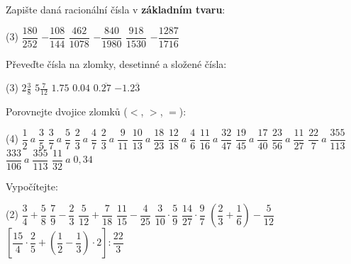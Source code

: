 \documentclass[12pt,a4paper]{article}
\begin{document}
\newpage
\setcounter{section}{3}
\begin{exercise}
Zapište daná racionální čísla v \textbf{základním tvaru}:
\begin{tasks}(3)
    \task $\dfrac{180}{252}$
    \task $-\dfrac{108}{144}$
    \task $\dfrac{462}{1078}$
    \task $-\dfrac{840}{1980}$
    \task $\dfrac{918}{1530}$
    \task $-\dfrac{1287}{1716}$
\end{tasks}
\end{exercise}

\begin{exercise}
Převeďte čísla na zlomky, desetinné a složené čísla:
\begin{tasks}(3)
    \task $2\tfrac{3}{8}$
    \task $5\tfrac{7}{12}$
    \task $1.75$
    \task $0.04$
    \task $0.\overline{27}$
    \task $-1.2\overline{3}$
\end{tasks}
\end{exercise}

\begin{exercise}
Porovnejte dvojice zlomků ($<$, $>$, $=$):
\begin{tasks}(4)
    \task $\dfrac{1}{2}\ a \;\dfrac{3}{5}$
    \task $\dfrac{3}{7}\ a \;\dfrac{5}{7}$
    \task $\dfrac{2}{3}\ a \;\dfrac{4}{7}$
    \task $\dfrac{2}{3}\ a \;\dfrac{9}{11}$
    \task $\dfrac{10}{13}\ a \;\dfrac{18}{23}$
    \task $\dfrac{12}{18}\ a \;\dfrac{4}{6}$
    \task $\dfrac{11}{16}\ a \;\dfrac{32}{47}$
    \task $\dfrac{19}{45}\ a \;\dfrac{17}{40}$
    \task $\dfrac{23}{56}\ a \;\dfrac{11}{27}$
    \task $\dfrac{22}{7}\ a \;\dfrac{355}{113}$
    \task $\dfrac{333}{106}\ a \;\dfrac{355}{113}$
    \task $\dfrac{11}{32}\ a \;0,34$
\end{tasks}
\end{exercise}

\begin{exercise}
Vypočítejte:
\begin{tasks}(2)
    \task $\dfrac{3}{4}+\dfrac{5}{8}$
    \task $\dfrac{7}{9}-\dfrac{2}{3}$
    \task $\dfrac{5}{12}+\dfrac{7}{18}$
    \task $\dfrac{11}{15}-\dfrac{4}{25}$
    \task $\dfrac{3}{10}\cdot\dfrac{5}{9}$
    \task $\dfrac{14}{27}\cdot\dfrac{9}{7}$
    \task $\left(\dfrac{2}{3}+\dfrac{1}{6}\right)-\dfrac{5}{12}$
    \task $\left[\dfrac{15}{4} \cdot \dfrac{2}{5} + \left(\dfrac{1}{2}-\dfrac{1}{3}\right)\cdot 2\right]:\dfrac{22}{3}$
\end{tasks}
\end{exercise}
\end{document}
